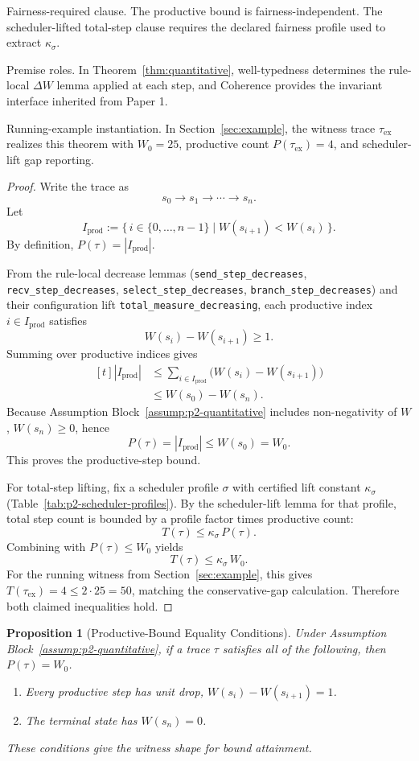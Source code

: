 \documentclass[a4paper,10pt,twocolumn,english]{article}
\numberwithin{equation}{section}
\theoremstyle{paperdef}
\theoremstyle{paperplain}
\newtheorem{proposition}[definition]{Proposition}
\theoremstyle{paperdef}
\theoremstyle{paperremark}
\begin{document}
Fairness-required clause. The productive bound is fairness-independent. The
scheduler-lifted total-step clause requires the declared fairness profile used
to extract $\kappa_\sigma$.

Premise roles. In Theorem~\ref{thm:quantitative}, well-typedness determines the
rule-local $\Delta W$ lemma applied at each step, and Coherence provides the
invariant interface inherited from Paper 1.

Running-example instantiation. In Section~\ref{sec:example}, the witness trace
$\tau_{\mathrm{ex}}$ realizes this theorem with $W_0=25$, productive count
$P(\tau_{\mathrm{ex}})=4$, and scheduler-lift gap reporting.

\begin{proof}
	Write the trace as
	\[
		s_0 \to s_1 \to \cdots \to s_n.
	\]
	Let
	\[
		I_{\mathrm{prod}}:=\{\,i\in\{0,\dots,n-1\}\mid W(s_{i+1})<W(s_i)\,\}.
	\]
	By definition, $P(\tau)=|I_{\mathrm{prod}}|$.

	From the rule-local decrease lemmas
	(\nolinkurl{send_step_decreases},
	\nolinkurl{recv_step_decreases},
	\nolinkurl{select_step_decreases},
	\nolinkurl{branch_step_decreases})
	and their configuration lift
	\nolinkurl{total_measure_decreasing}, each productive index $i\in I_{\mathrm{prod}}$ satisfies
	\[
		W(s_i)-W(s_{i+1})\ge 1.
	\]
	Summing over productive indices gives
	\[
		\begin{aligned}[t]
			|I_{\mathrm{prod}}|
			 & \le \sum_{i\in I_{\mathrm{prod}}}\big(W(s_i)-W(s_{i+1})\big) \\
			 & \le W(s_0)-W(s_n).
		\end{aligned}
	\]
	Because Assumption Block~\ref{assump:p2-quantitative} includes non-negativity of $W$,
	$W(s_n)\ge 0$, hence
	\[
		P(\tau)=|I_{\mathrm{prod}}|\le W(s_0)=W_0.
	\]
	This proves the productive-step bound.

	For total-step lifting, fix a scheduler profile $\sigma$ with certified lift constant
	$\kappa_\sigma$ (Table~\ref{tab:p2-scheduler-profiles}). By the scheduler-lift lemma for that
	profile, total step count is bounded by a profile factor times productive count:
	\[
		T(\tau)\le \kappa_\sigma\,P(\tau).
	\]
	Combining with $P(\tau)\le W_0$ yields
	\[
		T(\tau)\le \kappa_\sigma\,W_0.
	\]
	For the running witness from Section~\ref{sec:example}, this gives
	$T(\tau_{\mathrm{ex}})=4 \le 2\cdot 25 = 50$, matching the conservative-gap
	calculation.
	Therefore both claimed inequalities hold.
\end{proof}

\begin{proposition}[Productive-Bound Equality Conditions]
	\label{prop:p2-productive-equality}
	Under Assumption Block~\ref{assump:p2-quantitative}, if a trace $\tau$ satisfies all of the following, then $P(\tau)=W_0$.
	\begin{enumerate}
		\item Every productive step has unit drop, $W(s_i)-W(s_{i+1})=1$.
		\item The terminal state has $W(s_n)=0$.
	\end{enumerate}
	These conditions give the witness shape for bound attainment.
\end{proposition}
\end{document}
